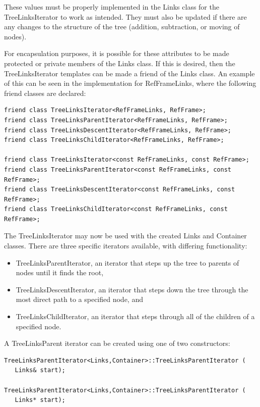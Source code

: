 These values must be properly implemented in the Links class for the
TreeLinksIterator to work as intended. They must also be updated if there
are any changes to the structure of the tree (addition, subtraction, or moving
of nodes).

For encapsulation purposes, it is possible for these attributes
to be made protected or private members of the Links class. If this is
desired, then the TreeLinksIterator templates can be made a friend
of the Links class. An example of this can be seen in the implementation
for RefFrameLinks, where the following friend classes are declared:

\begin{verbatim}
friend class TreeLinksIterator<RefFrameLinks, RefFrame>;
friend class TreeLinksParentIterator<RefFrameLinks, RefFrame>;
friend class TreeLinksDescentIterator<RefFrameLinks, RefFrame>;
friend class TreeLinksChildIterator<RefFrameLinks, RefFrame>;

friend class TreeLinksIterator<const RefFrameLinks, const RefFrame>;
friend class TreeLinksParentIterator<const RefFrameLinks, const RefFrame>;
friend class TreeLinksDescentIterator<const RefFrameLinks, const RefFrame>;
friend class TreeLinksChildIterator<const RefFrameLinks, const RefFrame>;
\end{verbatim}

The TreeLinksIterator may now be used with the created Links and Container
classes. There are three specific iterators available, with
differing functionality:

\begin{itemize}
\item{TreeLinksParentIterator}, an iterator that steps up the tree to
parents of nodes until it finds the root,
\item{TreeLinksDescentIterator}, an iterator that steps down the tree
through the most direct path to a specified node, and
\item{TreeLinksChildIterator}, an iterator that steps through all of the
children of a specified node.
\end{itemize}

A TreeLinksParent iterator can be created using one of two constructors:

\begin{verbatim}
TreeLinksParentIterator<Links,Container>::TreeLinksParentIterator (
   Links& start);

TreeLinksParentIterator<Links,Container>::TreeLinksParentIterator (
   Links* start);
\end{verbatim}

